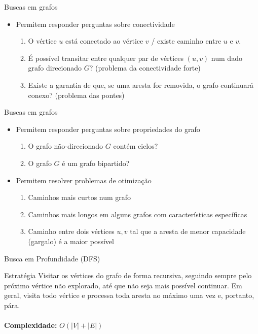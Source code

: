 \begin{frame}{Buscas em grafos}
    \begin{itemize}
        \item Permitem responder perguntas sobre conectividade
        \begin{enumerate}
            \item O vértice $u$ está conectado ao vértice $v$ / existe caminho entre $u$ e $v$.
            \item É possível transitar entre qualquer par de vértices $(u, v)$ num dado grafo direcionado $G$? (problema da conectividade forte)
            \item Existe a garantia de que, se uma aresta for removida, o grafo continuará conexo? (problema das pontes)
        \end{enumerate}
    \end{itemize}
\end{frame}

\begin{frame}{Buscas em grafos}
    \begin{itemize}
        \item Permitem responder perguntas sobre propriedades do grafo
        \begin{enumerate}
            \item O grafo não-direcionado $G$ contém ciclos?
            \item O grafo $G$ é um grafo bipartido?
        \end{enumerate}
    \end{itemize}
    
    \begin{itemize}
        \item Permitem resolver problemas de otimização
        \begin{enumerate}
            \item Caminhos mais curtos num grafo
            \item Caminhos mais longos em alguns grafos com características específicas
            \item Caminho entre dois vértices $u, v$ tal que a aresta de menor capacidade (gargalo) é a maior possível
        \end{enumerate}
    \end{itemize}
\end{frame}


\begin{frame}{Busca em Profundidade (DFS)}
    \begin{block}{Estratégia}
        Visitar os vértices do grafo de forma recursiva, seguindo sempre pelo próximo vértice não explorado, até que não seja mais possível continuar. Em geral, visita todo vértice e processa toda aresta no máximo uma vez e, portanto, pára. \\~\\
        
        \textbf{Complexidade:} $O(|V|+|E|)$
    \end{block}
\end{frame}

